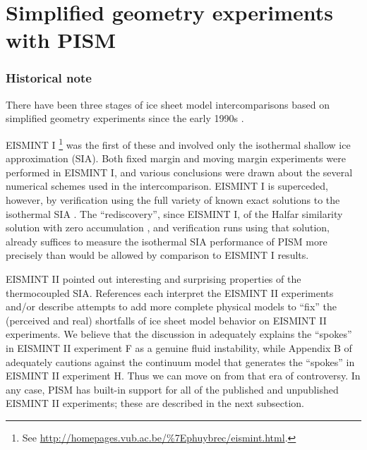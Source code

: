 
\section{Simplified geometry experiments with PISM}\label{sect:simp}

\subsubsection*{Historical note}  There have been three stages of ice sheet model intercomparisons based on simplified geometry experiments since the early 1990s \cite{BuelerSpray}.

EISMINT I \cite[ European Ice Sheet Modeling INiTiative]{EISMINT96}\footnote{See \url{http://homepages.vub.ac.be/\%7Ephuybrec/eismint.html}.} was the first of these and involved only the isothermal shallow ice approximation (SIA).  Both fixed margin and moving margin experiments were performed in EISMINT I, and various conclusions were drawn about the several numerical schemes used in the intercomparison.  EISMINT I is superceded, however, by verification using the full variety of known exact solutions to the isothermal SIA \cite{BLKCB}.  The ``rediscovery'', since EISMINT I, of the Halfar similarity solution with zero accumulation \cite{Halfar83}, and verification runs using that solution, already suffices to measure the isothermal SIA performance of PISM more precisely than would be allowed by comparison to EISMINT I results.

EISMINT II \cite{EISMINT00} pointed out interesting and surprising properties of the thermocoupled SIA.  References \cite{BBL,Hindmarsh04,Hindmarsh06,PayneBaldwin,SaitoEISMINT,BBssasliding} each interpret the EISMINT II experiments and/or describe attempts to add more complete physical models to ``fix'' the (perceived and real) shortfalls of ice sheet model behavior on EISMINT II experiments.  We believe that the discussion in \cite{PayneDongelmans,PayneBaldwin,BBL} adequately explains the ``spokes'' in EISMINT II experiment F as a genuine fluid instability, while Appendix B of \cite{BBssasliding} adequately cautions against the continuum model that generates the ``spokes'' in EISMINT II experiment H.   Thus we can move on from that era of controversy.  In any case, PISM has built-in support for all of the published and unpublished EISMINT II experiments; these are described in the next subsection.

